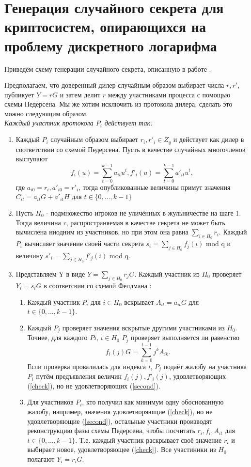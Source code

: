 \section{Генерация случайного секрета для криптосистем, опирающихся на проблему дискретного логарифма}

Приведём схему генерации случайного секрета, описанную в работе \cite{Gen}.

Предполагаем, что доверенный дилер случайным образом выбирает числа $r, r'$, публикует $Y = rG$ и затем делит $r$ между участниками процесса с помощью схемы Педерсена. Мы же хотим исключить из протокола дилера, сделать это можно следующим образом.\\

\textit{Каждый участник протокола $P_i$ действует так:}

\begin{enumerate}
    \item Каждый $P_i$ случайным образом выбирает $r_i, r'_i \in Z_q$ и действует как дилер в соответствии со схемой Педерсена. Пусть в качестве случайных многочленов выступают
    $$ f_i(u) = \sum_{t=0}^{k-1}a_{it}u^t , f'_i(u) = \sum_{t=0}^{k-1}a'_{it}u^t,$$ где $a_{i0} = r_i, a'_{i0} = r'_i$, тогда опубликованные величины примут значения $C_{it} = a_{it}G + a'_{it}H$ для $t\in\{0, ...,k-1\}$
    \item Пусть $H_0$ - подмножество игроков не уличённых в жульничестве на шаге 1. Тогда величина $r$, распространяемая в качестве секрета не может быть вычислена ниодним из участников, но при этом она равна $\sum_{i \in H_0}r_i$. Каждый $P_i$ вычисляет значение своей части секрета $s_i = \sum_{j \in H_0}f_j(i)$ mod q и величину $s'_i = \sum_{j \in H_0}f'_j(i)$ mod q.
    \item Представляем Y в виде $Y = \sum_{j \in H_0}r_jG$. Каждый участник из $H_0$ проверяет $Y_i = s_iG$ в соответсвии со схемой Фелдмана \cite{Fel}:
    \begin{enumerate}[label=\alph*)]
        \item Каждый участник $P_i$ для $i \in H_0$ вскрывает $A_{it} = a_{it}G$ для $t \in \{0, ...,k-1\}$. 
        \item Каждый $P_j$ проверяет значения вскрытые другими участниками из $H_0$. Точнее, для каждого $Pi$, $i \in H_0$ $P_j$ проверяет выполняется ли равенство
        \begin{equation}\label{second}
            f_i(j)G = \sum_{k=0}^{t-1} j^k A_{ik}.
        \end{equation}
        Если проверка провалилась для индекса $i$, $P_j$ подаёт жалобу на участника $P_i$ путём предъявления величин $f_i(j), f'_i(j)$, удовлетворяющих (\ref{check}), но не удовлетворяющих (\ref{second}).
        \item Для участников  $P_i$, кто получил как минимум одну обоснованную жалобу, например, значения удовлетворяющие (\ref{check}), но не удовлетворяющие (\ref{second}), остальные участники производят реконструкцию фазы схемы Педерсена, чтобы посчитать $r_i, f_i, A_{it}$ для $t \in \{0,...,k-1\}$. Т.е. каждый участник раскрывает своё значение $r_i$ и выбирает новое, удовлетворяющее (\ref{check}). Все участиники из $H_0$ полагают $Y_i = r_iG$. 
    \end{enumerate}
    

\end{enumerate}
